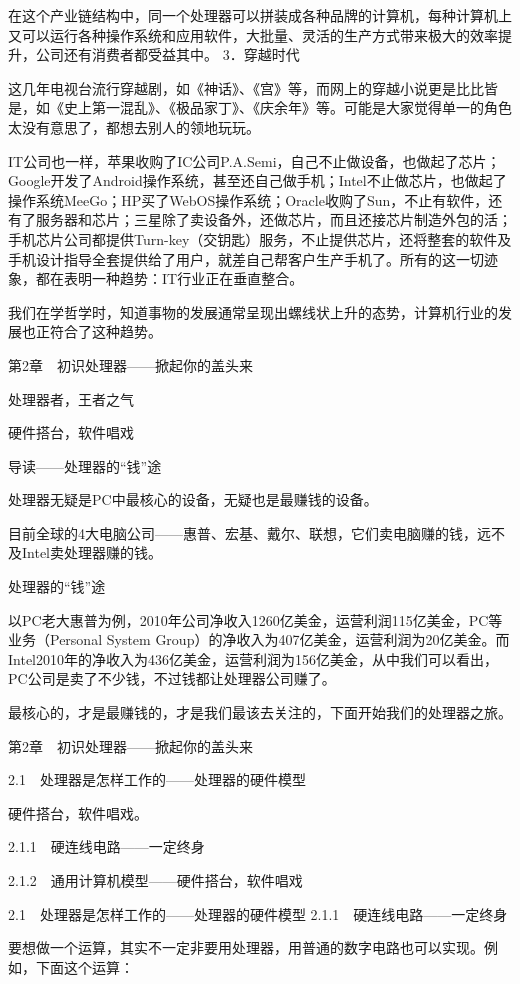 \documentclass[12pt,UTF8]{ctexbook}
\begin{document}
在这个产业链结构中，同一个处理器可以拼装成各种品牌的计算机，每种计算机上又可以运行各种操作系统和应用软件，大批量、灵活的生产方式带来极大的效率提升，公司还有消费者都受益其中。
3．穿越时代

这几年电视台流行穿越剧，如《神话》、《宫》等，而网上的穿越小说更是比比皆是，如《史上第一混乱》、《极品家丁》、《庆余年》等。可能是大家觉得单一的角色太没有意思了，都想去别人的领地玩玩。

IT公司也一样，苹果收购了IC公司P.A.Semi，自己不止做设备，也做起了芯片；Google开发了Android操作系统，甚至还自己做手机；Intel不止做芯片，也做起了操作系统MeeGo；HP买了WebOS操作系统；Oracle收购了Sun，不止有软件，还有了服务器和芯片；三星除了卖设备外，还做芯片，而且还接芯片制造外包的活；手机芯片公司都提供Turn-key（交钥匙）服务，不止提供芯片，还将整套的软件及手机设计指导全套提供给了用户，就差自己帮客户生产手机了。所有的这一切迹象，都在表明一种趋势：IT行业正在垂直整合。

我们在学哲学时，知道事物的发展通常呈现出螺线状上升的态势，计算机行业的发展也正符合了这种趋势。


第2章　初识处理器——掀起你的盖头来

处理器者，王者之气

硬件搭台，软件唱戏



导读——处理器的“钱”途

处理器无疑是PC中最核心的设备，无疑也是最赚钱的设备。

目前全球的4大电脑公司——惠普、宏基、戴尔、联想，它们卖电脑赚的钱，远不及Intel卖处理器赚的钱。

处理器的“钱”途

以PC老大惠普为例，2010年公司净收入1260亿美金，运营利润115亿美金，PC等业务（Personal System Group）的净收入为407亿美金，运营利润为20亿美金。而Intel2010年的净收入为436亿美金，运营利润为156亿美金，从中我们可以看出，PC公司是卖了不少钱，不过钱都让处理器公司赚了。

最核心的，才是最赚钱的，才是我们最该去关注的，下面开始我们的处理器之旅。


第2章　初识处理器——掀起你的盖头来

2.1　处理器是怎样工作的——处理器的硬件模型

硬件搭台，软件唱戏。

2.1.1　硬连线电路——一定终身

2.1.2　通用计算机模型——硬件搭台，软件唱戏


2.1　处理器是怎样工作的——处理器的硬件模型
2.1.1　硬连线电路——一定终身

要想做一个运算，其实不一定非要用处理器，用普通的数字电路也可以实现。例如，下面这个运算：
\end{document}
